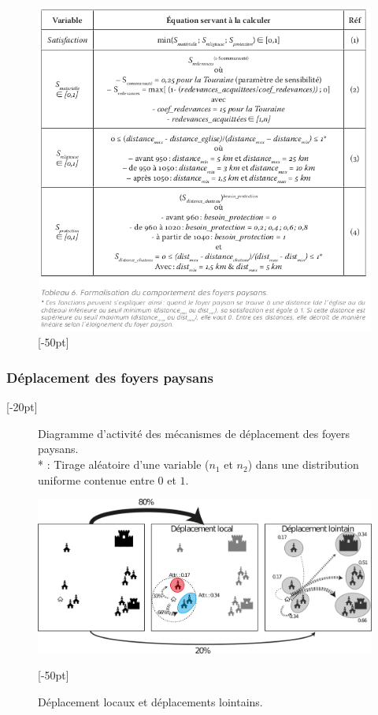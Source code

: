 \begin{figure}[H]
	\centering
	\includegraphics[width=1\linewidth]{src/Chapitre_TMD/Tab6.png}
	[-50pt]
\end{figure}

\clearpage
\subsubsection{Déplacement des foyers paysans}[-20pt]

\begin{figure}[H]
	
	\caption{Diagramme d'activité des mécanismes de déplacement des foyers paysans.\\
		* : Tirage aléatoire d'une variable ($n_1$ et $n_2$) dans une distribution uniforme contenue entre $0$ et $1$.}
\end{figure}


\begin{figure}[H]
	\centering
	\includegraphics[width=1\linewidth]{img/Deplacement.png}
	\caption{Déplacement locaux et déplacements lointains.}
	[-50pt]
\end{figure}

